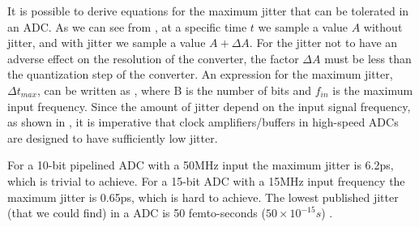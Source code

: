 It is possible to derive equations for the maximum jitter that can be
tolerated in an ADC. As we can see from , at a specific time $t$ we sample a value $A$ without jitter, and with jitter we sample a value $A + \Delta A$. For the
jitter not to have an adverse effect on the resolution of the
converter, the factor $\Delta A$ must be less than the quantization
step of the converter. An expression for the maximum
jitter, $\Delta t_{max}$, can be written as 
\cite{plassche}, where B is the number of bits and $f_{in}$ is the
maximum input frequency. 
Since the amount of jitter depend on the input signal frequency, as shown in
, it is imperative that clock amplifiers/buffers in high-speed
ADCs are designed to have sufficiently low jitter.

For a 10-bit pipelined ADC with a 50MHz input the maximum jitter is
6.2ps, which is trivial to achieve. For a 15-bit ADC with a 15MHz input frequency
the maximum jitter is 0.65ps, which is hard to achieve. The lowest
published jitter (that we could find) in a ADC is 50 femto-seconds
($50\times10^{-15}s$) \cite{ali06}.



